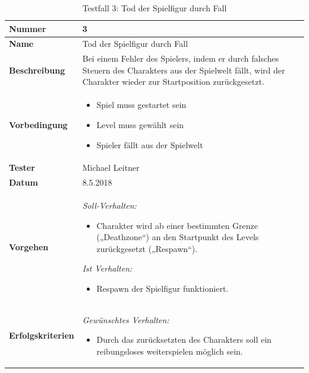 \newpage
\def \currentAuthor {Michael Leitner}
\begin{table}

	\renewcommand{\arraystretch}{1.5}
	\begin{tabular}{|p{3.5cm}|p{11cm}|}
		
		\hline 
		\textbf{Nummer} & 3 \\ 
		\hline 
		\textbf{Name} & {\large Tod der Spielfigur durch Fall} \\ 
		\hline 
		\textbf{Beschreibung} & 
		Bei einem Fehler des Spielers, indem er durch falsches Steuern des Charakters aus der Spielwelt fällt, wird der Charakter wieder zur Startposition zurückgesetzt. \\ 
		\hline 
		\textbf{Vorbedingung} & 
		\begin{itemize}
			\setlength{\itemsep}{1pt}
			\setlength{\parskip}{0.5pt}
			\item Spiel muss gestartet sein
			\item Level muss gewählt sein
			\item Spieler fällt aus der Spielwelt
		\end{itemize} \\ 
		\hline 
		\textbf{Tester} & Michael Leitner \\ 
		\hline 
		\textbf{Datum} & 8.5.2018 \\ 
		\hline 
		\textbf{Vorgehen} & 
		\textit{Soll-Verhalten:}
		\begin{itemize}
			\setlength{\itemsep}{1pt}
			\setlength{\parskip}{0.5pt}
			\item Charakter wird ab einer bestimmten Grenze („Deathzone“) an den Startpunkt des Levels zurückgesetzt („Respawn“).\newline
		\end{itemize}  
		
		
		\textit{Ist Verhalten:}
		\begin{itemize}
			\setlength{\itemsep}{1pt}
			\setlength{\parskip}{0.5pt}
			\item Respawn der Spielfigur funktioniert. 
		\end{itemize}\\ 
		\hline 
		\textbf{Erfolgskriterien} & 
		\textit{Gewünschtes Verhalten:}
		\begin{itemize}
			\setlength{\itemsep}{1pt}
			\setlength{\parskip}{0.5pt}
			\item Durch das zurücksetzten des Charakters soll ein reibungsloses weiterspielen möglich sein.
		\end{itemize} \\ 
		\hline 
	\end{tabular} 
	\caption{Testfall 3: Tod der Spielfigur durch Fall}
\end{table}

